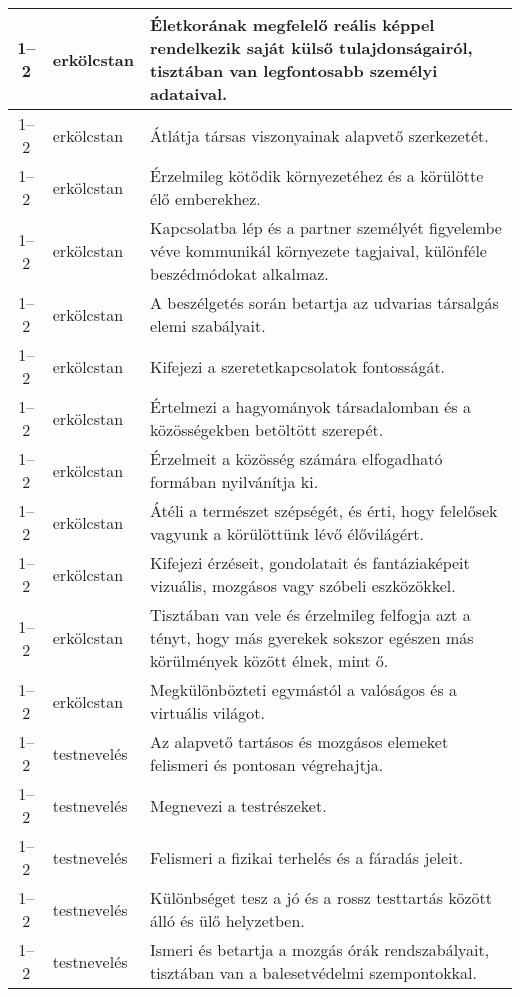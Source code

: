 \begin{small}
\begin{longtable}{c | p{2cm} |  p{11cm} }
              1--2 & erkölcstan & Életkorának megfelelő reális képpel rendelkezik saját külső tulajdonságairól, tisztában van legfontosabb személyi adataival. \\ \hline
              1--2 & erkölcstan & Átlátja társas viszonyainak alapvető szerkezetét. \\ \hline
              1--2 & erkölcstan & Érzelmileg kötődik környezetéhez és a körülötte élő emberekhez. \\ \hline
              1--2 & erkölcstan & Kapcsolatba lép és a partner személyét figyelembe véve kommunikál környezete tagjaival, különféle beszédmódokat alkalmaz. \\ \hline
              1--2 & erkölcstan & A beszélgetés során betartja az udvarias társalgás elemi szabályait. \\ \hline
              1--2 & erkölcstan & Kifejezi a szeretetkapcsolatok fontosságát. \\ \hline
              1--2 & erkölcstan & Értelmezi a hagyományok társadalomban és a közösségekben betöltött szerepét. \\ \hline
              1--2 & erkölcstan & Érzelmeit a közösség számára elfogadható formában nyilvánítja ki. \\ \hline
              1--2 & erkölcstan & Átéli a természet szépségét, és érti, hogy felelősek vagyunk a körülöttünk lévő élővilágért. \\ \hline
              1--2 & erkölcstan & Kifejezi érzéseit, gondolatait és fantáziaképeit vizuális, mozgásos vagy szóbeli eszközökkel. \\ \hline
              1--2 & erkölcstan & Tisztában van vele és érzelmileg felfogja azt a tényt, hogy más gyerekek sokszor egészen más körülmények között élnek, mint ő. \\ \hline
              1--2 & erkölcstan & Megkülönbözteti egymástól a valóságos és a virtuális világot. \\ \hline
              1--2 & testnevelés & Az alapvető tartásos és mozgásos elemeket felismeri és pontosan végrehajtja. \\ \hline
              1--2 & testnevelés & Megnevezi a testrészeket. \\ \hline
              1--2 & testnevelés & Felismeri a fizikai terhelés és a fáradás jeleit. \\ \hline
              1--2 & testnevelés & Különbséget tesz a jó és a rossz testtartás között álló és ülő helyzetben. \\ \hline
              1--2 & testnevelés & Ismeri és betartja a mozgás órák rendszabályait, tisztában van a balesetvédelmi szempontokkal. \\ \hline

\end{longtable}
\end{small}
